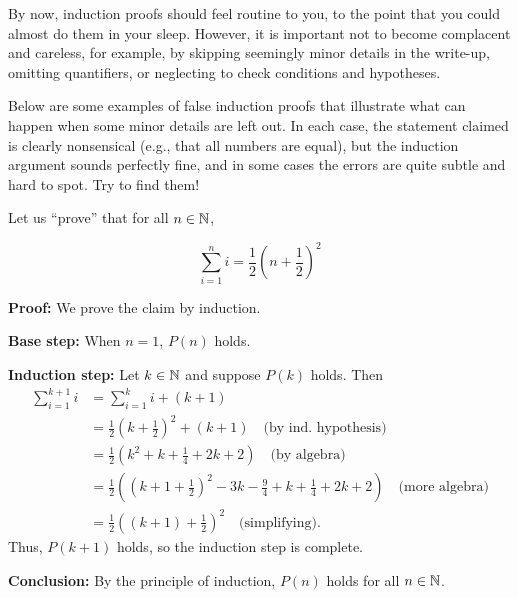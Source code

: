 By now, induction proofs should feel routine to you, to the point that you
could almost do them in your sleep.  However, it is important not to become
complacent and careless, for example, by skipping seemingly minor details in
the write-up, omitting quantifiers, or neglecting to check conditions and
hypotheses. 

Below are some examples of false induction proofs that illustrate what can
happen when some minor details are left out.  In each case, the statement 
claimed is clearly nonsensical (e.g., that all numbers are equal), but the
induction argument sounds perfectly fine, and in some cases the errors are quite
subtle and hard to spot. Try to find them!

\begin{example}\label{example:induction:fall1} Let us ``prove'' that for all $n\in\mathbb{N}$,  

\[
\tag{$P(n)$} \sum_{i=1}^n i=\frac12(n+\frac12)^2
\]

\textbf{Proof:} We prove the claim by induction. 

\textbf{Base step:} When $n=1$, $P(n)$ holds.

\textbf{Induction step:} 
Let $k\in\mathbb{N}$ and 
suppose $P(k)$ holds. Then
\begin{align*}
\sum_{i=1}^{k+1} i &=\sum_{i=1}^k i + (k+1)
\\
&=\frac12\left(k+\frac12\right)^2+ (k+1)
\quad\text{(by ind. hypothesis)}
\\
&=\frac12\left(k^2+k+\frac14+2k+2\right)
\quad\text{(by algebra)}
\\
&=\frac12\left(\left(k+1+\frac12\right)^2-3k-\frac94 +k+\frac14+2k+2\right)
\quad\text{(more algebra)}
\\
&=\frac12\left((k+1)+\frac12\right)^2
\quad\text{(simplifying).}
\end{align*}
Thus, $P(k+1)$ holds,  so the induction
step is complete.

\textbf{Conclusion:} By the principle of induction, $P(n)$ holds for all
$n\in\mathbb{N}$.
\end{example}

%



